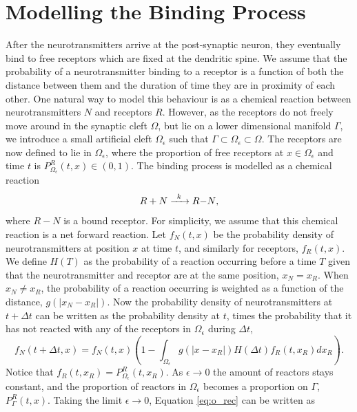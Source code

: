 \documentclass{article}
\begin{document}
\section{Modelling the Binding Process}\label{Section:BindingProcess}
After the neurotransmitters arrive at the post-synaptic neuron, they eventually bind to free receptors which are fixed at the dendritic spine.
We assume that the probability of a neurotransmitter binding to a receptor is a function of both the distance between them and the duration of time they are in proximity of each other.
One natural way to model this behaviour is as a chemical reaction between neurotransmitters $N$ and receptors $R$.
However, as the receptors do not freely move around in the synaptic cleft $\Omega$, but lie on a lower dimensional manifold $\Gamma$, we introduce a small artificial cleft $\Omega_\epsilon$ such that $\Gamma \subset \Omega_\epsilon \subset \Omega$.
The receptors are now defined to lie in $\Omega_\epsilon$, where the proportion of free receptors at $x \in \Omega_\epsilon$ and time $t$ is $P_{\Omega_\epsilon}^{R}(t, x) \in (0,1)$.
The binding process is modelled as a chemical reaction 
\begin{equation*}
    \ce{$R$ + $N$ ->[$k$] $R-N$},
\end{equation*} 
where $R-N$ is a bound receptor. For simplicity, we assume that this chemical reaction is a net forward reaction. 
Let $f_N(t, x)$ be the probability density of neurotransmitters at position $x$ at time $t$, and similarly for receptors, $f_R(t, x)$.
We define $H(T)$ as the probability of a reaction occurring before a time $T$ given that the neurotransmitter and receptor are at the same position, $x_N = x_R$.
When $x_N \neq  x_R$, the probability of a reaction occurring is weighted as a function of the distance, $g(|x_N - x_R|)$.
Now the probability density of neurotransmitters at $t + \Delta t$ can be written as the probability density at $t$, times the probability that it has not reacted with any of the receptors in $\Omega_\epsilon$ during $\Delta t$,
\begin{equation}\label{eq:o_rec}
        f_N(t + \Delta t, x) = f_N(t, x)\left(1 - \int_{\Omega_\epsilon}^{}g(|x - x_R|) H(\Delta t)f_R(t, x_R)dx_R\right).
\end{equation}
Notice that $f_R(t, x_R) = P_{\Omega_\epsilon}^{R}(t,x_R)$.
As $\epsilon \rightarrow 0$ the amount of reactors stays constant, and the proportion of reactors in $\Omega_\epsilon$ becomes a proportion on $\Gamma$, $P_\Gamma^R(t,x)$.
Taking the limit $\epsilon \rightarrow 0$, Equation \eqref{eq:o_rec} can be written as 
\end{document}
